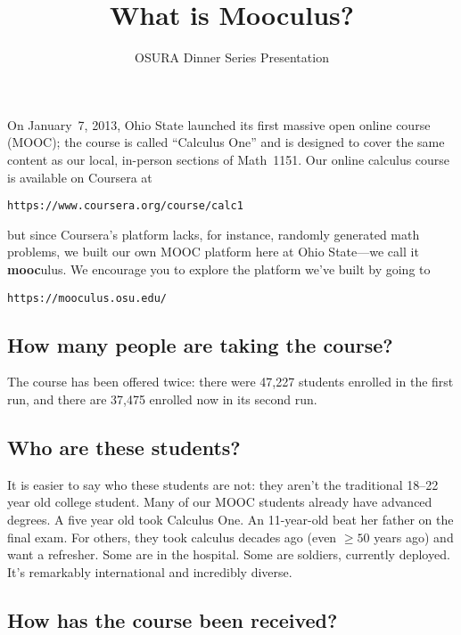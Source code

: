 \documentclass[12pt]{amsart}
\title{What is Mooculus?}
\author{OSURA Dinner Series Presentation}
\newcommand{\mooculus}{\textsf{\textbf{mooc}ulus}}
\begin{document}
\maketitle
\pagestyle{empty}
\thispagestyle{empty} 

On January~7, 2013, Ohio State launched its first massive open online
course (MOOC); the course is called ``Calculus One'' and is designed
to cover the same content as our local, in-person sections of
Math~1151.  Our online calculus course is available on Coursera at
\begin{center}
\texttt{https://www.coursera.org/course/calc1}
\end{center}
but since Coursera's platform lacks, for instance, randomly generated
math problems, we built our own MOOC platform here at Ohio State---we
call it \mooculus.  We encourage you to explore the platform we've
built by going to
\begin{center}
\texttt{https://mooculus.osu.edu/}
\end{center}

\subsection*{How many people are taking the course?}

The course has been offered twice: there were 47,227 students enrolled
in the first run, and there are 37,475 enrolled now in its second run.


\subsection*{Who are these students?}

It is easier to say who these students are not: they aren't the
traditional 18--22 year old college student.  Many of our MOOC
students already have advanced degrees.  A five year old took Calculus
One.  An 11-year-old beat her father on the final exam.  For others,
they took calculus decades ago (even $\geq 50$ years ago) and want a
refresher.  Some are in the hospital.  Some are soldiers, currently
deployed.  It's remarkably international and incredibly diverse.

\subsection*{How has the course been received?}
\end{document}

